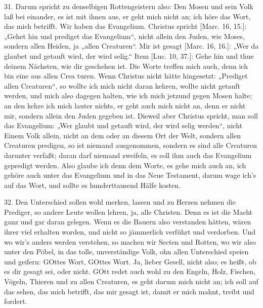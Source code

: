 31. Darum spricht zu denselbigen Rottengeistern also: Den Mosen und sein Volk laß bei einander, es ist mit ihnen aus, er geht mich nicht an; ich höre das Wort, das mich betrifft. Wir haben das Evangelium. Christus spricht [Marc. 16, 15.]: „Gehet hin und prediget das Evangelium“, nicht allein den Juden, wie Moses, sondern allen Heiden, ja „allen Creaturen“. Mir ist gesagt [Marc. 16, 16.]: „Wer da glaubet und getauft wird, der wird selig.“ Item [Luc. 10, 37.]: Gehe hin und thue deinem Nächsten, wie dir geschehen ist. Die Worte treffen mich auch, denn ich bin eine aus allen Crea
turen. Wenn Christus nicht hätte hingesetzt: „Prediget allen Creaturen“, so wollte ich mich nicht daran kehren, wollte nicht getauft werden, und mich also dagegen halten, wie ich mich jetzund gegen Mosen halte; an den kehre ich mich lauter nichts, er geht auch mich nicht an, denn er nicht mir, sondern allein den Juden gegeben ist. Dieweil aber Christus spricht, man soll das Evangelium: „Wer glaubt und getauft wird, der wird selig werden“, nicht Einem Volk allein, nicht an dem oder an diesem Ort der Welt, sondern allen Creaturen predigen, so ist niemand ausgenommen, sondern es sind alle Creaturen darunter verfaßt; daran darf niemand zweifeln, es soll ihm auch das Evangelium gepredigt werden. Also glaube ich denn dem Worte, es gehe mich auch an, ich gehöre auch unter das Evangelium und in das Neue Testament, darum wage ich’s auf das Wort, und sollte es hunderttausend Hälfe kosten.

32. Den Unterschied sollen wohl merken, lassen und zu Herzen nehmen die Prediger, so andere Leute wollen lehren, ja, alle Christen. Denn es ist die Macht ganz und gar daran gelegen. Wenn es die Bauern also verstanden hätten, wären ihrer viel erhalten worden, und nicht so jämmerlich verführt und verdorben. Und wo wir’s anders werden verstehen, so machen wir Secten und Rotten, wo wir also unter den Pöbel, in das tolle, unverständige Volk, ohn allen Unterschied speien und geifern: GOttes Wort, GOttes Wort. Ja, lieber Gesell, nicht also; es heißt, ob es dir gesagt sei, oder nicht. GOtt redet auch wohl zu den Engeln, Holz, Fischen, Vögeln, Thieren und zu allen Creaturen, es geht darum mich nicht an; ich soll auf das sehen, das mich betrifft, das mir gesagt ist, damit er mich mahnt, treibt und fordert.

